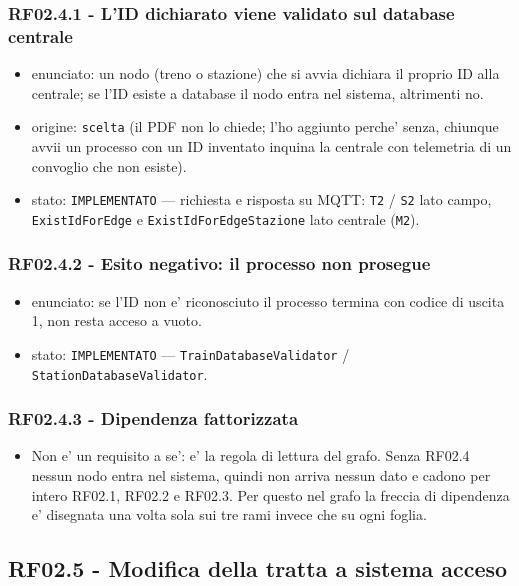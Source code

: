\documentclass[11pt]{article}
\begin{document}
\subsubsection{RF02.4.1 - L'ID dichiarato viene validato sul database centrale}
\label{sec:orgf1b1745}
\begin{itemize}
\item enunciato: un nodo (treno o stazione) che si avvia dichiara il proprio ID alla centrale; se l'ID
esiste a database il nodo entra nel sistema, altrimenti no.
\item origine: \texttt{scelta} (il PDF non lo chiede; l'ho aggiunto perche' senza, chiunque avvii un processo
con un ID inventato inquina la centrale con telemetria di un convoglio che non esiste).
\item stato: \texttt{IMPLEMENTATO} — richiesta e risposta su MQTT: \texttt{T2} / \texttt{S2} lato campo,
\texttt{ExistIdForEdge} e \texttt{ExistIdForEdgeStazione} lato centrale (\texttt{M2}).
\end{itemize}
\subsubsection{RF02.4.2 - Esito negativo: il processo non prosegue}
\label{sec:org066abb5}
\begin{itemize}
\item enunciato: se l'ID non e' riconosciuto il processo termina con codice di uscita 1, non resta
acceso a vuoto.
\item stato: \texttt{IMPLEMENTATO} — \texttt{TrainDatabaseValidator} / \texttt{StationDatabaseValidator}.
\end{itemize}
\subsubsection{RF02.4.3 - Dipendenza fattorizzata}
\label{sec:org9f472b0}
\begin{itemize}
\item Non e' un requisito a se': e' la regola di lettura del grafo. Senza RF02.4 nessun nodo entra nel
sistema, quindi non arriva nessun dato e cadono per intero RF02.1, RF02.2 e RF02.3. Per questo nel
grafo la freccia di dipendenza e' disegnata una volta sola sui tre rami invece che su ogni foglia.
\end{itemize}
\subsection{RF02.5 - Modifica della tratta a sistema acceso}
\label{sec:org20ced76}
\end{document}
